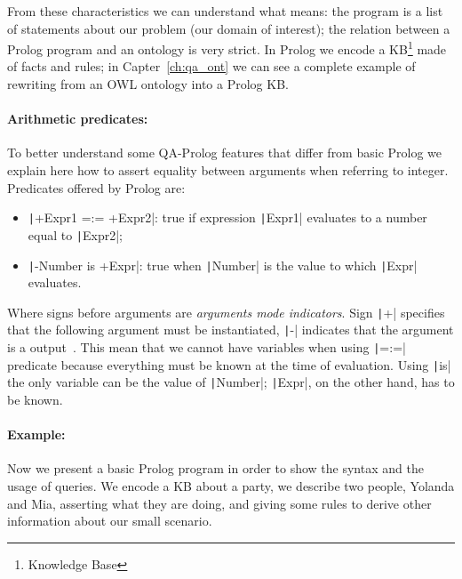 From these characteristics we can understand what  means: the program is a list of statements about our problem (our domain of interest); the relation between a Prolog program and an ontology is very strict. In Prolog we encode a KB\footnote{Knowledge Base} made of facts and rules; in Capter~\ref{ch:qa_ont} we can see a complete example of rewriting from an OWL ontology into a Prolog KB.

\paragraph{Arithmetic predicates:}\label{par:arithmetic} To better understand some QA-Prolog features that differ from basic Prolog we explain here how to assert equality between arguments when referring to integer. Predicates offered by Prolog are:
\begin{itemize}
	\item \texttt|+Expr1 =:= +Expr2|: true if expression \texttt|Expr1| evaluates to a number equal to \texttt|Expr2|;
	\item   \texttt|-Number is +Expr|: true when \texttt|Number| is the value to which \texttt|Expr| evaluates.
\end{itemize}
Where signs before arguments are \emph{arguments mode indicators}. Sign \texttt|+| specifies that the following argument must be instantiated, \texttt|-| indicates that the argument is a output~\cite{SWI2026PrologManual}. This mean that we cannot have variables when using \texttt|=:=| predicate because everything must be known at the time of evaluation. Using \texttt|is| the only variable can be the value of \texttt|Number|; \texttt|Expr|, on the other hand, has to be known.

\paragraph{Example:} Now we present a basic Prolog program in order to show the syntax and the usage of queries. We encode a KB about a party, we describe two people, Yolanda and Mia, asserting what they are doing, and giving some rules to derive other information about our small scenario.
\begin{listingenv}[h]
	\caption{Basic KB}
	\label{lst:prolog_kb1}
\end{listingenv}

